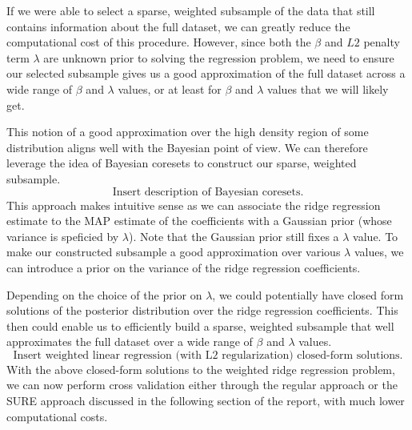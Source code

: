 If we were able to select a sparse, weighted subsample of the data that still contains information about the full dataset, we can greatly reduce the computational cost of this procedure. However, since both the $\beta$ and $L2$ penalty term $\lambda$ are unknown prior to solving the regression problem, we need to ensure our selected subsample gives us a good approximation of the full dataset across a wide range of $\beta$ and $\lambda$ values, or at least for $\beta$ and $\lambda$ values that we will likely get.

This notion of a good approximation over the high density region of some distribution aligns well with the Bayesian point of view. We can therefore leverage the idea of Bayesian coresets to construct our sparse, weighted subsample.
\[
\text{Insert description of Bayesian coresets.}
\]
This approach makes intuitive sense as we can associate the ridge regression estimate to the MAP estimate of the coefficients with a Gaussian prior (whose variance is speficied by $\lambda$). Note that the Gaussian prior still fixes a $\lambda$ value. To make our constructed subsample a good approximation over various $\lambda$ values, we can introduce a prior on the variance of the ridge regression coefficients. 

Depending on the choice of the prior on $\lambda$, we could potentially have closed form solutions of the posterior distribution over the ridge regression coefficients. This then could enable us to efficiently build a sparse, weighted subsample that well approximates the full dataset over a wide range of $\beta$ and $\lambda$ values.
\[
\text{Insert weighted linear regression (with L2 regularization) closed-form solutions.}
\]
With the above closed-form solutions to the weighted ridge regression problem, we can now perform cross validation either through the regular approach or the SURE approach discussed in the following section of the report, with much lower computational costs.

